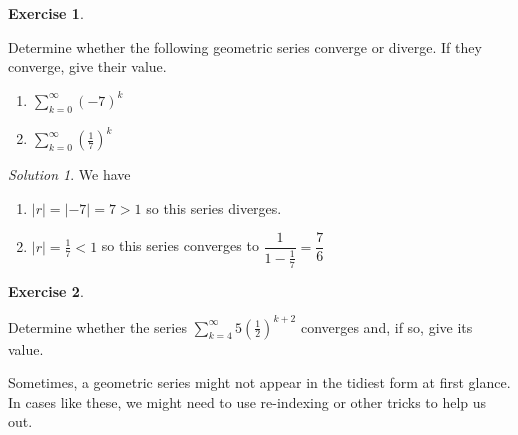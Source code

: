 \documentclass[
]{book}
\providecommand{\tightlist}{%
  \setlength{\itemsep}{0pt}\setlength{\parskip}{0pt}}
\theoremstyle{definition}
\theoremstyle{definition}
\theoremstyle{definition}
\newtheorem{exercise}{Exercise}[chapter]
\theoremstyle{definition}
\theoremstyle{remark}
\newtheorem*{solution}{Solution}
\begin{document}
\begin{exercise}
\protect\hypertarget{exr:unlabeled-div-178}{}\label{exr:unlabeled-div-178}

Determine whether the following geometric series converge or diverge. If they converge, give their value.

\begin{enumerate}
\def\labelenumi{\alph{enumi}.}
\tightlist
\item
  \(\displaystyle \sum_{k=0}^\infty (-7)^k\)
\item
  \(\displaystyle \sum_{k=0}^\infty \left ( \frac{1}{7} \right)^k\)
\end{enumerate}

\end{exercise}

\begin{solution}

We have

\begin{enumerate}
\def\labelenumi{\alph{enumi}.}
\tightlist
\item
  \(|r|=|-7|=7>1\) so this series diverges.
\item
  \(|r|=\frac{1}{7}<1\) so this series converges to \(\dfrac{1}{1-\frac{1}{7}}=\dfrac{7}{6}\)
\end{enumerate}

\end{solution}

\begin{exercise}
\protect\hypertarget{exr:unlabeled-div-180}{}\label{exr:unlabeled-div-180}

Determine whether the series \(\displaystyle \sum_{k=4}^\infty 5 \left (\frac{1}{2} \right)^{k+2}\) converges and, if so, give its value.

\end{exercise}

Sometimes, a geometric series might not appear in the tidiest form at first glance. In cases like these, we might need to use re-indexing or other tricks to help us out.
\end{document}
